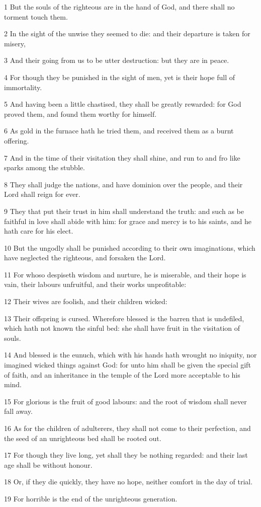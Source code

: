 \par 1 But the souls of the righteous are in the hand of God, and there shall no torment touch them.
\par 2 In the sight of the unwise they seemed to die: and their departure is taken for misery,
\par 3 And their going from us to be utter destruction: but they are in peace.
\par 4 For though they be punished in the sight of men, yet is their hope full of immortality.
\par 5 And having been a little chastised, they shall be greatly rewarded: for God proved them, and found them worthy for himself.
\par 6 As gold in the furnace hath he tried them, and received them as a burnt offering.
\par 7 And in the time of their visitation they shall shine, and run to and fro like sparks among the stubble.
\par 8 They shall judge the nations, and have dominion over the people, and their Lord shall reign for ever.
\par 9 They that put their trust in him shall understand the truth: and such as be faithful in love shall abide with him: for grace and mercy is to his saints, and he hath care for his elect.
\par 10 But the ungodly shall be punished according to their own imaginations, which have neglected the righteous, and forsaken the Lord.
\par 11 For whoso despiseth wisdom and nurture, he is miserable, and their hope is vain, their labours unfruitful, and their works unprofitable:
\par 12 Their wives are foolish, and their children wicked:
\par 13 Their offspring is cursed. Wherefore blessed is the barren that is undefiled, which hath not known the sinful bed: she shall have fruit in the visitation of souls.
\par 14 And blessed is the eunuch, which with his hands hath wrought no iniquity, nor imagined wicked things against God: for unto him shall be given the special gift of faith, and an inheritance in the temple of the Lord more acceptable to his mind.
\par 15 For glorious is the fruit of good labours: and the root of wisdom shall never fall away.
\par 16 As for the children of adulterers, they shall not come to their perfection, and the seed of an unrighteous bed shall be rooted out.
\par 17 For though they live long, yet shall they be nothing regarded: and their last age shall be without honour.
\par 18 Or, if they die quickly, they have no hope, neither comfort in the day of trial.
\par 19 For horrible is the end of the unrighteous generation.

